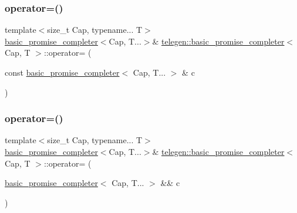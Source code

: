 \subsubsection{\texorpdfstring{operator=()}{operator=()}\hspace{0.1cm}{\footnotesize\ttfamily [1/2]}}
{\footnotesize\ttfamily template$<$size\+\_\+t Cap, typename... T$>$ \\
\hyperlink{classtelegen_1_1basic__promise__completer}{basic\+\_\+promise\+\_\+completer}$<$Cap, T...$>$\& \hyperlink{classtelegen_1_1basic__promise__completer}{telegen\+::basic\+\_\+promise\+\_\+completer}$<$ Cap, T $>$\+::operator= (\begin{DoxyParamCaption}\item[{const \hyperlink{classtelegen_1_1basic__promise__completer}{basic\+\_\+promise\+\_\+completer}$<$ Cap, T... $>$ \&}]{c }\end{DoxyParamCaption})\hspace{0.3cm}{\ttfamily [delete]}}

\mbox{\label{classtelegen_1_1basic__promise__completer_adec620b895120563b905186a8612d9cb}} 
\subsubsection{\texorpdfstring{operator=()}{operator=()}\hspace{0.1cm}{\footnotesize\ttfamily [2/2]}}
{\footnotesize\ttfamily template$<$size\+\_\+t Cap, typename... T$>$ \\
\hyperlink{classtelegen_1_1basic__promise__completer}{basic\+\_\+promise\+\_\+completer}$<$Cap, T...$>$\& \hyperlink{classtelegen_1_1basic__promise__completer}{telegen\+::basic\+\_\+promise\+\_\+completer}$<$ Cap, T $>$\+::operator= (\begin{DoxyParamCaption}\item[{\hyperlink{classtelegen_1_1basic__promise__completer}{basic\+\_\+promise\+\_\+completer}$<$ Cap, T... $>$ \&\&}]{c }\end{DoxyParamCaption})\hspace{0.3cm}{\ttfamily [delete]}}

\mbox{\label{classtelegen_1_1basic__promise__completer_ab6a8b85cfc515084a6791cd34c1bf0d9}} 
